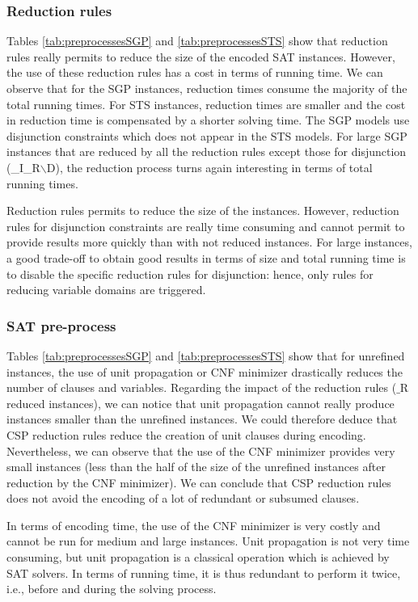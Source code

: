 \documentclass[3p,authoryear,times]{elsarticle}
\begin{document}
\subsubsection{Reduction rules}
Tables \ref{tab:preprocessesSGP} and \ref{tab:preprocessesSTS} show that reduction rules really permits to reduce the size of the encoded SAT instances. However, the use of these reduction rules has a cost in terms of running time. We can observe that for the SGP instances, reduction times consume the majority of the total running times. For STS instances, reduction times are smaller and the cost in reduction time is compensated by a shorter solving  time. The SGP models use disjunction constraints which does not appear in the STS models. For large SGP instances that are reduced by all the reduction rules except those for disjunction (\_I\_R$\backslash$D), the reduction process turns again interesting in terms of total running times.

Reduction rules permits to reduce the size of the instances. However, reduction rules for disjunction constraints are really time consuming and cannot permit to provide results more quickly than with not reduced instances. For large instances, a good trade-off to obtain good results in terms of size and total running time is to disable the specific reduction rules for disjunction: hence, only rules for reducing variable domains are triggered.


\subsubsection{SAT pre-process}

Tables \ref{tab:preprocessesSGP} and \ref{tab:preprocessesSTS} show that for unrefined instances, the use of unit propagation or CNF minimizer drastically reduces the number of clauses and variables. Regarding the impact of the reduction rules ($\_$R reduced instances), we can notice that unit propagation cannot really produce  instances smaller than the unrefined instances. We could therefore deduce that CSP reduction rules 
reduce the creation of unit clauses during encoding. Nevertheless, we can observe that the use of the CNF minimizer provides very small instances (less than the half of the size of the unrefined instances after reduction by the CNF minimizer). We can conclude that CSP reduction rules does not avoid the encoding of a lot of redundant or subsumed clauses.

In terms of encoding time, the use of the CNF minimizer is very costly and cannot be run for medium and large instances. Unit propagation is not very time consuming, but unit propagation is a classical operation which is achieved by SAT solvers. In terms of running time, it is thus redundant to perform it twice, i.e., before and during the solving process.
\end{document}
